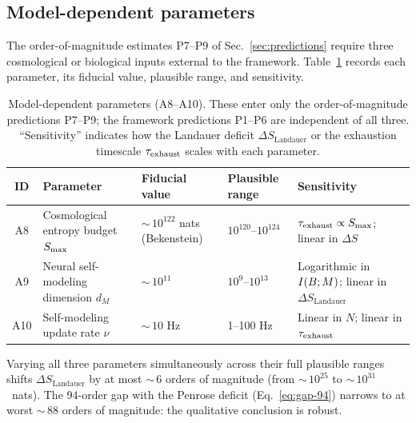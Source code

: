 \subsection{Model-dependent parameters}\label{app:model-params}

The order-of-magnitude estimates P7--P9 of Sec.~\ref{sec:predictions}
require three cosmological or biological inputs external to the
framework.  Table~\ref{tab:params} records each parameter, its
fiducial value, plausible range, and sensitivity.

\begin{table}[t]
  \centering
  \caption{Model-dependent parameters (A8--A10).  These enter only the
  order-of-magnitude predictions P7--P9; the framework predictions
  P1--P6 are independent of all three.  ``Sensitivity'' indicates how
  the Landauer deficit $\Delta S_{\mathrm{Landauer}}$ or the
  exhaustion timescale $\tau_{\mathrm{exhaust}}$ scales with each parameter.}
  \label{tab:params}
  \begin{tabular}{@{}c l l l l@{}}
    \toprule
    ID & Parameter & Fiducial value & Plausible range & Sensitivity \\
    \midrule
    A8 & Cosmological entropy budget $S_{\max}$
       & ${\sim}\,10^{122}$ nats (Bekenstein)
       & $10^{120}$--$10^{124}$
       & $\tau_{\mathrm{exhaust}} \propto S_{\max}$;
         linear in $\Delta S$ \\[4pt]
    A9 & Neural self-modeling dimension $d_M$
       & ${\sim}\,10^{11}$
       & $10^{9}$--$10^{13}$
       & Logarithmic in $I(B;M)$;
         linear in $\Delta S_{\mathrm{Landauer}}$ \\[4pt]
    A10 & Self-modeling update rate $\nu$
        & ${\sim}\,10$ Hz
        & 1--100 Hz
        & Linear in $N$;
          linear in $\tau_{\mathrm{exhaust}}$ \\
    \bottomrule
  \end{tabular}
\end{table}

\noindent
Varying all three parameters simultaneously across their full
plausible ranges shifts $\Delta S_{\mathrm{Landauer}}$ by at most
${\sim}\,6$ orders of magnitude (from ${\sim}\,10^{25}$ to
${\sim}\,10^{31}$~nats).  The 94-order gap with the Penrose deficit
(Eq.~\eqref{eq:gap-94}) narrows to at worst ${\sim}\,88$ orders of
magnitude: the qualitative conclusion is robust.

